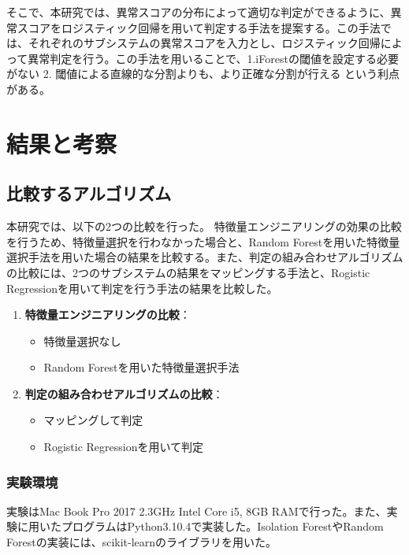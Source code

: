 \documentclass{css}
\begin{document}
そこで、本研究では、異常スコアの分布によって適切な判定ができるように、異常スコアをロジスティック回帰を用いて判定する手法を提案する。この手法では、それぞれのサブシステムの異常スコアを入力とし、ロジスティック回帰によって異常判定を行う。この手法を用いることで、1.iForestの閾値を設定する必要がない 2. 閾値による直線的な分割よりも、より正確な分割が行える という利点がある。

\section{結果と考察}

\subsection{比較するアルゴリズム}

本研究では、以下の2つの比較を行った。
特徴量エンジニアリングの効果の比較を行うため、特徴量選択を行わなかった場合と、Random Forestを用いた特徴量選択手法を用いた場合の結果を比較する。また、判定の組み合わせアルゴリズムの比較には、2つのサブシステムの結果をマッピングする手法と、Rogistic Regressionを用いて判定を行う手法の結果を比較した。

\begin{enumerate}
    \item \textbf{特徴量エンジニアリングの比較}：
        \begin{itemize}
            \item 特徴量選択なし
            \item Random Forestを用いた特徴量選択手法
        \end{itemize}
    \item \textbf{判定の組み合わせアルゴリズムの比較}：
        \begin{itemize}
            \item マッピングして判定
            \item Rogistic Regressionを用いて判定
        \end{itemize}
\end{enumerate}

\subsubsection{実験環境}

実験はMac Book Pro 2017 2.3GHz Intel Core i5, 8GB RAMで行った。また、実験に用いたプログラムはPython3.10.4で実装した。Isolation ForestやRandom Forestの実装には、scikit-learnのライブラリを用いた。
\end{document}
